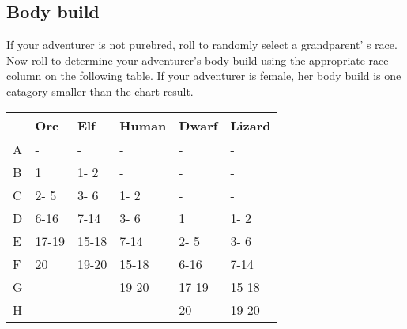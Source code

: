 \begin{multicols*}{2}
\section{Body build}
If your adventurer is not purebred, roll  to randomly select a grandparent' s race. Now roll  to determine your adventurer's body build using the appropriate race column on the following table. If your adventurer is female, her body build is one catagory smaller than the chart result.
\begin{tcolorbox}[breakable,boxrule=0pt,title=\textbf{Body Build}]
\begin{tabular}{l l l l l l}
 & Orc & Elf & Human & Dwarf & Lizard\\
\midrule
A & - & - & - & - & -\\
B & 1 & 1- 2 & - & - & -\\
C & 2- 5 & 3- 6 & 1- 2 & - & -\\
D & 6-16 & 7-14 & 3- 6 & 1 & 1- 2\\
E & 17-19 & 15-18 & 7-14 & 2- 5 & 3- 6\\
F & 20 & 19-20 & 15-18 & 6-16 & 7-14\\
G & - & - & 19-20 & 17-19 & 15-18\\
H & - & - & - & 20 & 19-20\\
\end{tabular}
\end{tcolorbox}

\end{multicols*}
